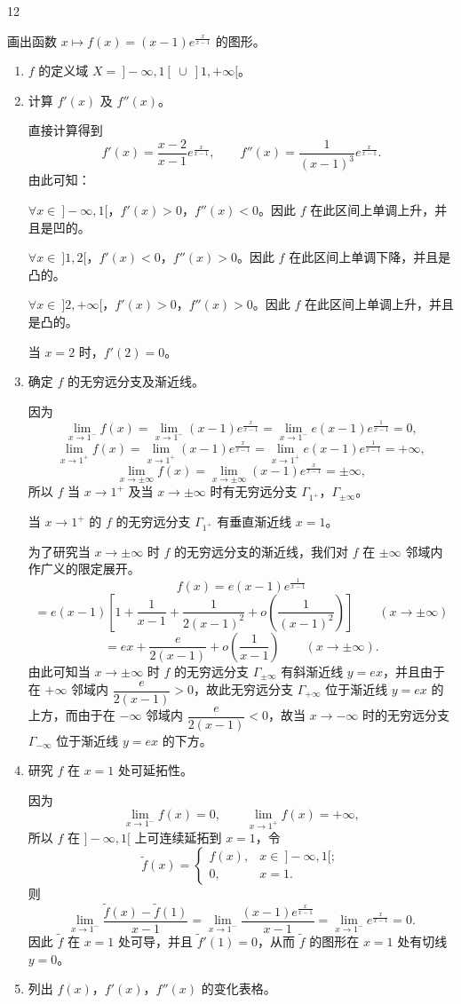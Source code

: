 \begin{sourceexample}{12}

画出函数 $x\longmapsto f(x)=(x-1)e^{\frac{x}{x-1}}$ 的图形。

\begin{enumerate}[label=\arabic{enumi})]
\item $f$ 的定义域 $X=\ ]-\infty,1[\ \cup\ ]1,+\infty[$。
\item 计算 $f'(x)$ 及 $f''(x)$。

直接计算得到
\[f'(x)=\frac{x-2}{x-1}e^{\frac{x}{x-1}},\qquad f''(x)=\frac{1}{(x-1)^3}e^{\frac{x}{x-1}}.\]
由此可知：

$\forall x\in\ ]-\infty,1[$，$f'(x)>0$，$f''(x)<0$。因此 $f$ 在此区间上单调上升，并且是凹的。

$\forall x\in\ ]1,2[$，$f'(x)<0$，$f''(x)>0$。因此 $f$ 在此区间上单调下降，并且是凸的。

$\forall x\in\ ]2,+\infty[$，$f'(x)>0$，$f''(x)>0$。因此 $f$ 在此区间上单调上升，并且是凸的。

当 $x=2$ 时，$f'(2)=0$。
\item 确定 $f$ 的无穷远分支及渐近线。

因为
\[\lim_{x\to1^{-}}f(x)=\lim_{x\to1^{-}}(x-1)e^{\frac{x}{x-1}}=\lim_{x\to1^{-}}e(x-1)e^{\frac{1}{x-1}}=0,\]
\[\lim_{x\to1^{+}}f(x)=\lim_{x\to1^{+}}(x-1)e^{\frac{x}{x-1}}=\lim_{x\to1^{+}}e(x-1)e^{\frac{1}{x-1}}=+\infty,\]
\[\lim_{x\to\pm\infty}f(x)=\lim_{x\to\pm\infty}(x-1)e^{\frac{x}{x-1}}=\pm\infty,\]
所以 $f$ 当 $x\to1^+$ 及当 $x\to\pm\infty$ 时有无穷远分支 $\Gamma_{1^+}$，$\Gamma_{\pm\infty}$。

当 $x\to1^+$ 的 $f$ 的无穷远分支 $\Gamma_{1^+}$ 有垂直渐近线 $x=1$。

为了研究当 $x\to\pm\infty$ 时 $f$ 的无穷远分支的渐近线，我们对 $f$ 在 $\pm\infty$ 邻域内作广义的限定展开。
\[f(x)=e(x-1)e^{\frac{1}{x-1}}\]
\[=e(x-1)\left[1+\frac{1}{x-1}+\frac{1}{2(x-1)^2}+o\left(\frac{1}{(x-1)^2}\right)\right]\qquad(x\to\pm\infty)\]
\[=ex+\frac{e}{2(x-1)}+o\left(\frac{1}{x-1}\right)\qquad(x\to\pm\infty).\]
由此可知当 $x\to\pm\infty$ 时 $f$ 的无穷远分支 $\Gamma_{\pm\infty}$ 有斜渐近线 $y=ex$，并且由于在 $+\infty$ 邻域内 $\dfrac{e}{2(x-1)}>0$，故此无穷远分支 $\Gamma_{+\infty}$ 位于渐近线 $y=ex$ 的上方，而由于在 $-\infty$ 邻域内 $\dfrac{e}{2(x-1)}<0$，故当 $x\to-\infty$ 时的无穷远分支 $\Gamma_{-\infty}$ 位于渐近线 $y=ex$ 的下方。
\item 研究 $f$ 在 $x=1$ 处可延拓性。

因为
\[\lim_{x\to1^-}f(x)=0,\qquad\lim_{x\to1^+}f(x)=+\infty,\]
所以 $f$ 在 $]-\infty,1[$ 上可连续延拓到 $x=1$，令
\[\widetilde{f}(x)=\begin{cases} f(x), & x\in\ ]-\infty,1[;\\[1ex] 0, & x=1. \end{cases}\]
则
\[\lim_{x\to1^-}\frac{\widetilde{f}(x)-\widetilde{f}(1)}{x-1}=\lim_{x\to1^-}\frac{(x-1)e^{\frac{x}{x-1}}}{x-1}=\lim_{x\to1^-}e^{\frac{x}{x-1}}=0.\]
因此 $\widetilde{f}$ 在 $x=1$ 处可导，并且 $\widetilde{f}'(1)=0$，从而 $\widetilde{f}$ 的图形在 $x=1$ 处有切线 $y=0$。
\item 列出 $f(x)$，$f'(x)$，$f''(x)$ 的变化表格。


\end{enumerate}
\end{sourceexample}
